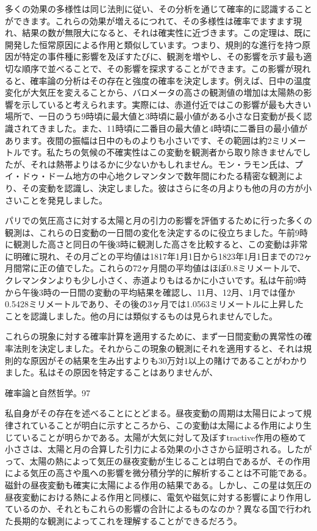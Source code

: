 \documentclass[a4paper,11pt,openany]{ltjsbook}
\begin{document}
多くの効果の多様性は同じ法則に従い、その分析を通じて確率的に認識することができます。これらの効果が増えるにつれて、その多様性は確率でますます現れ、結果の数が無限大になると、それは確実性に近づきます。この定理は、既に開発した恒常原因による作用と類似しています。つまり、規則的な進行を持つ原因が特定の事件種に影響を及ぼすたびに、観測を増やし、その影響を示す最も適切な順序で並べることで、その影響を探求することができます。この影響が現れると、確率論の分析はその存在と強度の確率を決定します。例えば、日中の温度変化が大気圧を変えることから、バロメータの高さの観測値の増加は太陽熱の影響を示していると考えられます。実際には、赤道付近ではこの影響が最も大きい場所で、一日のうち9時頃に最大値と3時頃に最小値がある小さな日変動が長く認識されてきました。また、11時頃に二番目の最大値と4時頃に二番目の最小値があります。夜間の振幅は日中のものよりも小さいです、その範囲は約2ミリメートルです。私たちの気候の不確実性はこの変動を観測者から取り除きませんでしたが、それは熱帯よりはるかに少ないかもしれません。モン・ラモン氏は、プイ・ドゥ・ドーム地方の中心地クレマンタンで数年間にわたる精密な観測により、その変動を認識し、決定しました。彼はさらに冬の月よりも他の月の方が小さいことを発見しました。

パリでの気圧高さに対する太陽と月の引力の影響を評価するために行った多くの観測は、これらの日変動の一日間の変化を決定するのに役立ちました。午前9時に観測した高さと同日の午後3時に観測した高さを比較すると、この変動は非常に明確に現れ、その月ごとの平均値は1817年1月1日から1823年1月1日までの72ヶ月間常に正の値でした。これらの72ヶ月間の平均値はほぼ0.8ミリメートルで、クレマンタンよりも少し小さく、赤道よりもはるかに小さいです。私は午前9時から午後3時の一日間の変動の平均結果を確認し、11月、12月、1月では僅か0.5428ミリメートルであり、その後の3ヶ月では1.0563ミリメートルに上昇したことを認識しました。他の月には類似するものは見られませんでした。

これらの現象に対する確率計算を適用するために、まず一日間変動の異常性の確率法則を決定しました。それからこの現象の観測にそれを適用すると、それは規則的な原因がその結果を生み出すよりも30万対1以上の賭けであることがわかりました。私はその原因を特定することはありませんが、

確率論と自然哲学。97

私自身がその存在を述べることにとどまる。昼夜変動の周期は太陽日によって規律されていることが明白に示すところから、この変動は太陽による作用により生じていることが明らかである。太陽が大気に対して及ぼすtractive作用の極めて小ささは、太陽と月の合算した引力による効果の小ささから証明される。したがって、太陽の熱によって気圧の昼夜変動が生じることは明白であるが、その作用による気圧の高さや風への影響を微分積分学的に解析することは不可能である。磁針の昼夜変動も確実に太陽による作用の結果である。しかし、この星は気圧の昼夜変動における熱による作用と同様に、電気や磁気に対する影響により作用しているのか、それともこれらの影響の合計によるものなのか？異なる国で行われた長期的な観測によってこれを理解することができるだろう。
\end{document}
